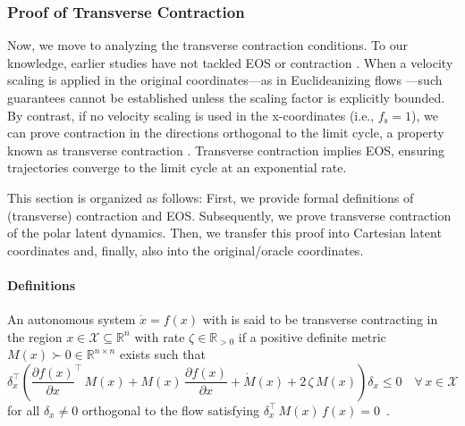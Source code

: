 \subsubsection{Proof of Transverse Contraction}
Now, we move to analyzing the transverse contraction conditions.
To our knowledge, earlier studies have not tackled \gls{EOS} or contraction \citep{lohmiller1998contraction}. When a velocity scaling is applied in the original coordinates—as in Euclideanizing flows \citep{rana2020euclideanizing}—such guarantees cannot be established unless the scaling factor is explicitly bounded. By contrast, if no velocity scaling is used in the x-coordinates (i.e., $f_\mathrm{s}=1$), we can prove contraction in the directions orthogonal to the limit cycle, a property known as transverse contraction \citep{manchester2014transverse}. Transverse contraction implies \gls{EOS}, ensuring trajectories converge to the limit cycle at an exponential rate.

This section is organized as follows: First, we provide formal definitions of (transverse) contraction and \gls{EOS}. Subsequently, we prove transverse contraction of the polar latent dynamics. Then, we transfer this proof into Cartesian latent coordinates and, finally, also into the original/oracle coordinates.

\paragraph{Definitions}
\begin{definition}\label{def:osmp:transverse_contraction}
    An autonomous system $\dot{x} = f(x)$ with is said to be transverse contracting in the region $x \in \mathcal{X} \subseteq \mathbb{R}^n$ with rate $\zeta \in \mathbb{R}_{>0}$ if a positive definite metric $M(x) \succ 0 \in \mathbb{R}^{n \times n}$ exists such that
    \begin{equation}
        \delta_{x}^\top \left ( \frac{\partial f(x)}{\partial x}^\top \, M(x) + M(x) \, \frac{\partial f(x)}{\partial x} + \dot{M}(x) + 2 \, \zeta \, M(x) \right ) \delta_{x} \leq 0
        \quad
        \forall \, x \in \mathcal{X}
    \end{equation}
    for all $\delta_{x} \neq 0$ orthogonal to the flow satisfying $\delta_{x}^\top \, M(x) \, f(x) = 0$~\citep{manchester2014transverse}.
\end{definition}

